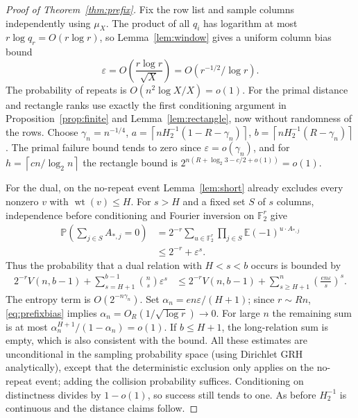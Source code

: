 \documentclass[11pt]{article}
\theoremstyle{remark}\newtheorem{remark}[theorem]{Remark}
\newcommand{\F}{\mathbb F_2}
\newcommand{\E}{\mathbb E}
\newcommand{\Prb}{\mathbb P}
\newcommand{\wt}{\operatorname{wt}}
\newcommand{\eps}{\varepsilon}
\newcommand{\Hbin}{H_2}
\newcommand{\ceil}[1]{\left\lceil #1\right\rceil}
\begin{document}
\begin{proof}[Proof of Theorem~\ref{thm:prefix}]
Fix the row list and sample columns independently using $\mu_X$. The product of all $q_i$ has logarithm at most $r\log q_r=O(r\log r)$, so Lemma~\ref{lem:window} gives a uniform column bias bound
\begin{equation}\label{eq:prefixbias}
 \eps=O\left(\frac{r\log r}{\sqrt X}\right)=O(r^{-1/2}/\log r).
\end{equation}
The probability of repeats is $O(n^2\log X/X)=o(1)$. For the primal distance and rectangle ranks use exactly the first conditioning argument in Proposition~\ref{prop:finite} and Lemma~\ref{lem:rectangle}, now without randomness of the rows. Choose $\gamma_n=n^{-1/4}$, $a=\ceil{n\Hbin^{-1}(1-R-\gamma_n)}$, $b=\ceil{n\Hbin^{-1}(R-\gamma_n)}$. The primal failure bound tends to zero since $\eps=o(\gamma_n)$, and for $h=\ceil{cn/\log_2n}$ the rectangle bound is $2^{n(R+\log_2 3-c/2+o(1))}=o(1)$.

For the dual, on the no-repeat event Lemma~\ref{lem:short} already excludes every nonzero $v$ with $\wt(v)\le H$. For $s>H$ and a fixed set $S$ of $s$ columns, independence before conditioning and Fourier inversion on $\F^r$ give
\begin{align*}
 \Prb\left(\sum_{j\in S}A_{*,j}=0\right)
 &=2^{-r}\sum_{u\in\F^r}\prod_{j\in S}\E(-1)^{u\cdot A_{*,j}}\\
 &\le 2^{-r}+\eps^s.
\end{align*}
Thus the probability that a dual relation with $H<s<b$ occurs is bounded by
\begin{align*}
 2^{-r}V(n,b-1)+\sum_{s=H+1}^{b-1}\binom ns\eps^s
 &\le 2^{-r}V(n,b-1)+\sum_{s\ge H+1}^{n}\left(\frac{en\eps}{s}\right)^s.
\end{align*}
The entropy term is $O(2^{-n\gamma_n})$. Set $\alpha_n=en\eps/(H+1)$; since $r\sim Rn$, \eqref{eq:prefixbias} implies $\alpha_n=O_R(1/\sqrt{\log r})\to0$. For large $n$ the remaining sum is at most $\alpha_n^{H+1}/(1-\alpha_n)=o(1)$. If $b\le H+1$, the long-relation sum is empty, which is also consistent with the bound. All these estimates are unconditional in the sampling probability space (using Dirichlet GRH analytically), except that the deterministic exclusion only applies on the no-repeat event; adding the collision probability suffices. Conditioning on distinctness divides by $1-o(1)$, so success still tends to one. As before $\Hbin^{-1}$ is continuous and the distance claims follow.
\end{proof}
\end{document}
